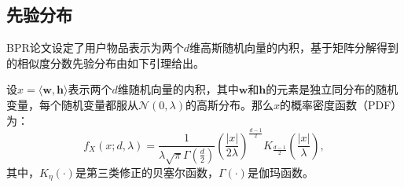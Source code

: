 \subsection{先验分布}
BPR论文设定了用户物品表示为两个$d$维高斯随机向量的内积，基于矩阵分解得到的相似度分数先验分布由如下引理给出。
\begin{lemma}\label{Lemma2:AprioriDistribution}
设$x=\langle \mathbf{w}, \mathbf{h} \rangle$表示两个$d$维随机向量的内积，其中$\mathbf{w}$和$\mathbf{h}$的元素是独立同分布的随机变量，每个随机变量都服从$\mathcal{N}(0, \lambda)$的高斯分布。那么$x$的概率密度函数（PDF）为：
	\begin{equation}
		f_{X}(x; d, \lambda) = \frac{1}{\lambda \sqrt{\pi} \Gamma(\frac{d}{2})}\left(\frac{|x|}{2\lambda} \right)^{\frac{d-1}{2}}K_{\frac{d-1}{2}}\left(\frac{|x|}{\lambda}\right),
	\end{equation}
	其中，$K_{\eta}(\cdot)$是第三类修正的贝塞尔函数，$\Gamma(\cdot)$是伽玛函数。
\end{lemma}
